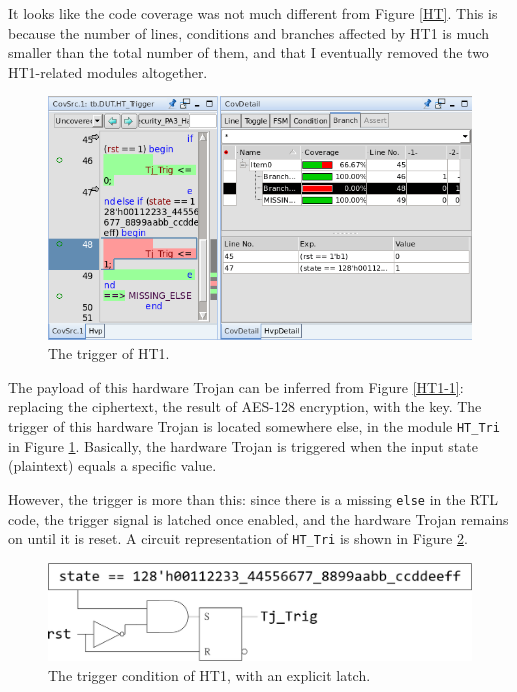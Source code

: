 \documentclass{article}
\begin{document}
It looks like the code coverage was not much different from Figure \ref{HT}. This is because the number of lines, conditions and branches affected by HT1 is much smaller than the total number of them, and that I eventually removed the two HT1-related modules altogether.

\begin{figure}[t] \centering
\includegraphics[width=\textwidth]{HT1-2}
\caption{The trigger of HT1.}
\label{HT1-2}
\end{figure}

The payload of this hardware Trojan can be inferred from Figure \ref{HT1-1}: replacing the ciphertext, the result of AES-128 encryption, with the key. The trigger of this hardware Trojan is located somewhere else, in the module \verb|HT_Tri| in Figure \ref{HT1-2}. Basically, the hardware Trojan is triggered when the input state (plaintext) equals a specific value.

However, the trigger is more than this: since there is a missing \verb|else| in the RTL code, the trigger signal is latched once enabled, and the hardware Trojan remains on until it is reset. A circuit representation of \verb|HT_Tri| is shown in Figure \ref{HT_Tri}.

\begin{figure}[h] \centering
\includegraphics[width=\textwidth]{HT_Tri}
\caption{The trigger condition of HT1, with an explicit latch.}
\label{HT_Tri}
\end{figure}
\end{document}

